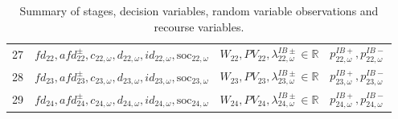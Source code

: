 \documentclass{article}
\newcommand{\R}{\mathbb{R}}
\newcommand{\soc}{\text{soc}}
\begin{document}
\begin{table}
\begin{tabular}{c c c c}
	27 & $fd_{22}, afd^{\pm}_{22}, c_{22, \omega}, d_{22, \omega}, id_{22, \omega}, \soc_{22, \omega}$ & $W_{22}, PV_{22}, \lambda^{IB\pm}_{22, \omega} \in \R$ & $p^{IB+}_{22, \omega}, p^{IB-}_{22, \omega}$ \\
	28 & $fd_{23}, afd^{\pm}_{23}, c_{23, \omega}, d_{23, \omega}, id_{23, \omega}, \soc_{23, \omega}$ & $W_{23}, PV_{23}, \lambda^{IB\pm}_{23, \omega} \in \R$ & $p^{IB+}_{23, \omega}, p^{IB-}_{23, \omega}$ \\
	29 & $fd_{24}, afd^{\pm}_{24}, c_{24, \omega}, d_{24, \omega}, id_{24, \omega}, \soc_{24, \omega}$ & $W_{24}, PV_{24}, \lambda^{IB\pm}_{24, \omega} \in \R$ & $p^{IB+}_{24, \omega}, p^{IB-}_{24, \omega}$ \\
		
	
\end{tabular}
\caption{Summary of stages, decision variables, random variable observations and recourse variables.}
\label{TABLE:stages-rv-dv}
\end{table}



\printbibliography
\end{document}
